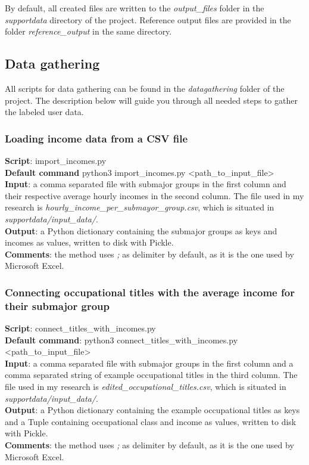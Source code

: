 \documentclass[
10pt, %
a4paper, %
oneside, %
headinclude,footinclude, %
] {book}%
\begin{document}
By default, all created files are written to the \textit{output\_files} folder in the \textit{supportdata} directory of the project. Reference output files are provided in the folder \textit{reference\_output} in the same directory.

\subsection{\textbf{Data gathering}}
All scripts for data gathering can be found in the \textit{datagathering} folder of the project. The description below will guide you through all needed steps to gather the labeled user data.

\subsubsection{Loading income data from a CSV file}
\textbf{Script}:	import\_incomes.py \\
\textbf{Default command} python3 import\_incomes.py <path\_to\_input\_file>\\
\textbf{Input}: a comma separated file with submajor groups in the first column and their respective average hourly incomes in the second column. The file used in my research is \textit{hourly\_income\_per\_submayor\_group.csv}, which is situated in \textit{supportdata/input\_data/}. \\
\textbf{Output}: a Python dictionary containing the submajor groups as keys and incomes as values, written to disk with Pickle. \\
\textbf{Comments}: the method uses \textit{; } as delimiter by default, as it is the one used by Microsoft Excel. 

\subsubsection{Connecting occupational titles with the average income for their submajor group}
\textbf{Script}:	connect\_titles\_with\_incomes.py \\
\textbf{Default command}: python3 connect\_titles\_with\_incomes.py <path\_to\_input\_file>\\
\textbf{Input}: a comma separated file with submajor groups in the first column and a comma separated string of example occupational titles in the third column. The file used in my research is \textit{edited\_occupational\_titles.csv}, which is situated in  \textit{supportdata/input\_data/}. \\
\textbf{Output}: a Python dictionary containing the example occupational titles as keys and a Tuple containing occupational class and income as values, written to disk with Pickle. \\
\textbf{Comments}: the method uses \textit{; } as delimiter by default, as it is the one used by Microsoft Excel. 
\end{document}
